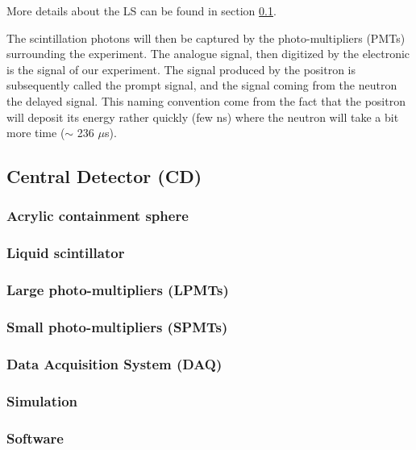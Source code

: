More details about the LS can be found in section \ref{sec:CD}.

The scintillation photons will then be captured by the photo-multipliers (PMTs) surrounding the experiment. The analogue signal, then digitized by the electronic is the signal of our experiment. The signal produced by the positron is subsequently called the prompt signal, and the signal coming from the neutron the delayed signal. This naming convention come from the fact that the positron will deposit its energy rather quickly (few ns) where the neutron will take a bit more time ($\sim$ 236 $\mu$s).

\subsection{Central Detector (CD)}
\label{sec:CD}

\subsubsection{Acrylic containment sphere}

\subsubsection{Liquid scintillator}

\subsubsection{Large photo-multipliers (LPMTs)}

\subsubsection{Small photo-multipliers (SPMTs)}

\subsubsection{Data Acquisition System (DAQ)}

\subsubsection{Simulation}

\subsubsection{Software}



